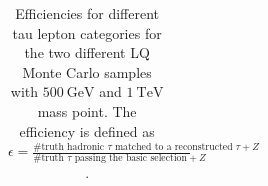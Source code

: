 \begin{table}
\begin{tabular*}{\linewidth}{@{\extracolsep{\fill}}ccccc}
		\hline
		\hline
		\end{tabular*}
		\caption[Efficiencies for the two LQ samples with $\SI{500}{\giga\electronvolt}$ and $\SI{1}{\tera\electronvolt}$ mass point.]{Efficiencies for different tau lepton categories for the two different LQ Monte Carlo samples with $\SI{500}{\giga\electronvolt}$ and $\SI{1}{\tera\electronvolt}$ mass point. The efficiency is defined as $\epsilon=\frac{\text{\#truth hadronic }\tau\text{ matched to a reconstructed }\tau+Z}{\text{\#truth }\tau\text{ passing the basic selection}+Z}$.}
		\label{LQEffTable}
                \renewcommand{\arraystretch}{1}
                \end{table}
%
%
